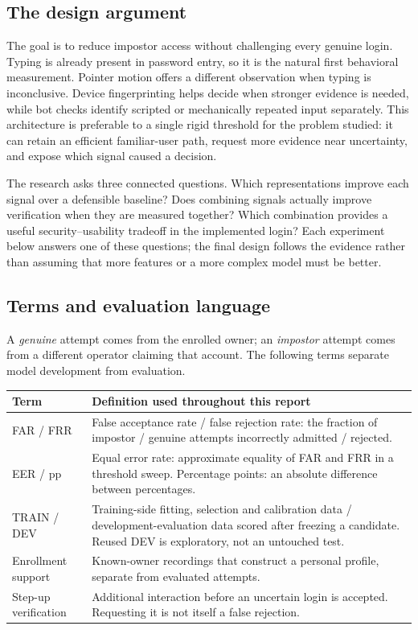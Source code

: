 \documentclass[10pt,a4paper]{article}
\begin{document}
\subsection{The design argument}
The goal is to reduce impostor access without challenging every genuine login. Typing is already present in password entry, so it is the natural first behavioral measurement. Pointer motion offers a different observation when typing is inconclusive. Device fingerprinting helps decide when stronger evidence is needed, while bot checks identify scripted or mechanically repeated input separately. This architecture is preferable to a single rigid threshold for the problem studied: it can retain an efficient familiar-user path, request more evidence near uncertainty, and expose which signal caused a decision.

The research asks three connected questions. Which representations improve each signal over a defensible baseline? Does combining signals actually improve verification when they are measured together? Which combination provides a useful security--usability tradeoff in the implemented login? Each experiment below answers one of these questions; the final design follows the evidence rather than assuming that more features or a more complex model must be better.

\subsection{Terms and evaluation language}
A \emph{genuine} attempt comes from the enrolled owner; an \emph{impostor} attempt comes from a different operator claiming that account. The following terms separate model development from evaluation.
\begin{center}\small
\begin{tabularx}{\linewidth}{@{}p{34mm}X@{}}
\toprule
\textbf{Term} & \textbf{Definition used throughout this report}\\\midrule
FAR / FRR & False acceptance rate / false rejection rate: the fraction of impostor / genuine attempts incorrectly admitted / rejected.\\
EER / pp & Equal error rate: approximate equality of FAR and FRR in a threshold sweep. Percentage points: an absolute difference between percentages.\\
TRAIN / DEV & Training-side fitting, selection and calibration data / development-evaluation data scored after freezing a candidate. Reused DEV is exploratory, not an untouched test.\\
Enrollment support & Known-owner recordings that construct a personal profile, separate from evaluated attempts.\\
Step-up verification & Additional interaction before an uncertain login is accepted. Requesting it is not itself a false rejection.\\\bottomrule
\end{tabularx}
\end{center}
\end{document}
